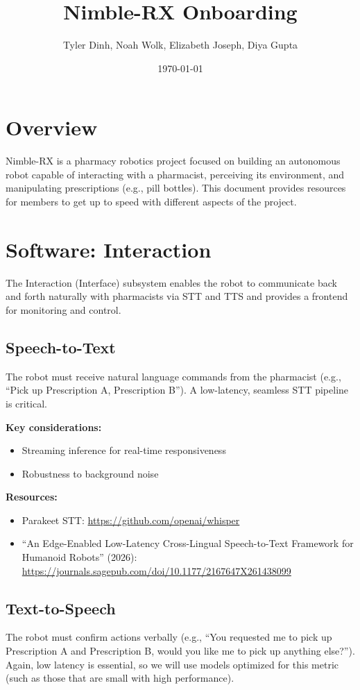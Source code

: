 \documentclass[11pt]{article}
\title{Nimble-RX Onboarding}
\author{Tyler Dinh, Noah Wolk, Elizabeth Joseph, Diya Gupta}
\date{\today}
\begin{document}
\maketitle

\section{Overview}
Nimble-RX is a pharmacy robotics project focused on building an autonomous robot capable of interacting with a pharmacist, perceiving its environment, and manipulating prescriptions (e.g., pill bottles). This document provides resources for members to get up to speed with different aspects of the project.

\section{Software: Interaction}
\label{sec:interface}

The Interaction (Interface) subsystem enables the robot to communicate back and forth naturally with pharmacists via STT and TTS and provides a frontend for monitoring and control.

\subsection{Speech-to-Text}
The robot must receive natural language commands from the pharmacist (e.g., ``Pick up Prescription A, Prescription B''). A low-latency, seamless STT pipeline is critical.

\textbf{Key considerations:}
\begin{itemize}[nosep]
    \item Streaming inference for real-time responsiveness
    \item Robustness to background noise
\end{itemize}

\textbf{Resources:}
\begin{itemize}[nosep]
    \item Parakeet STT: \url{https://github.com/openai/whisper}
    \item ``An Edge-Enabled Low-Latency Cross-Lingual Speech-to-Text Framework for Humanoid Robots'' (2026): \url{https://journals.sagepub.com/doi/10.1177/2167647X261438099}
\end{itemize}

\subsection{Text-to-Speech}
The robot must confirm actions verbally (e.g., ``You requested me to pick up Prescription A and Prescription B, would you like me to pick up anything else?''). Again, low latency is essential, so we will use models optimized for this metric (such as those that are small with high performance).
\end{document}
